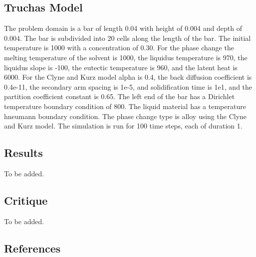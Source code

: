 \documentclass[12pt]{article}
\begin{document}
\subsection*{Truchas Model}

The problem domain is a bar of length 0.04 with height of 0.004 and depth of 0.004.  The bar is subdivided into 20 cells along the length of the bar.  The initial temperature is 1000 with a concentration of 0.30.  For the phase change the melting temperature of the solvent is 1000, the liquidus temperature is 970, the liquidus slope is -100, the eutectic temperature is 960, and the latent heat is 6000.  For the Clyne and Kurz model alpha is 0.4, the back diffusion coefficient is 0.4e-11, the secondary arm spacing is 1e-5, and solidification time is 1e1, and the partition coefficient constant is 0.65.  The left end of the bar has a Dirichlet temperature boundary condition of 800.  The liquid material has a temperature hneumann boundary condition.  The phase change type is alloy using the Clyne and Kurz model.  The simulation is run for 100 time steps, each of duration 1.

\subsection*{Results}

To be added.

\subsection*{Critique}

To be added.

\subsection*{References}
\end{document}
